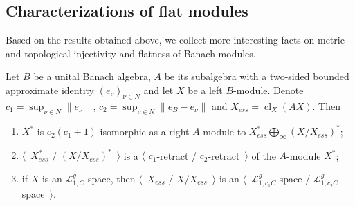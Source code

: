 
\subsection{
    Characterizations of flat modules}\label{SubSectionCharacterizationsOfFlatModules}

Based on the results obtained above, we collect more interesting facts on metric and
topological injectivity and flatness of Banach modules.

\begin{proposition}\label{DualBanModDecomp} Let $B$ be a unital Banach algebra,
$A$ be its subalgebra with a two-sided bounded approximate identity
${(e_\nu)}_{\nu\in N}$ and let $X$ be a left $B$-module. 
Denote $c_1=\sup_{\nu\in N}\lVert e_\nu\rVert$, 
$c_2=\sup_{\nu\in N}\lVert e_B-e_\nu\rVert$ and $X_{ess}=\operatorname{cl}_X(AX)$.
Then 

\begin{enumerate}[label = (\roman*)]
    \item $X^*$ is $c_2(c_1+1)$-isomorphic as a right $A$-module to
    $X_{ess}^*\bigoplus_\infty {(X/X_{ess})}^*$;

    \item $\langle$~$X_{ess}^*$ / ${(X/X_{ess})}^*$~$\rangle$ is a $\langle$
    $c_1$-retract / $c_2$-retract~$\rangle$ of the $A$-module $X^*$;

    \item if $X$ is an $\mathscr{L}_{1,C}^g$-space, then $\langle$~$X_{ess}$ /
    $X/X_{ess}$~$\rangle$ is an $\langle$~$\mathscr{L}_{1,c_1C}^g$-space /
    $\mathscr{L}_{1,c_2C}^g$-space~$\rangle$.
\end{enumerate}

\end{proposition}
